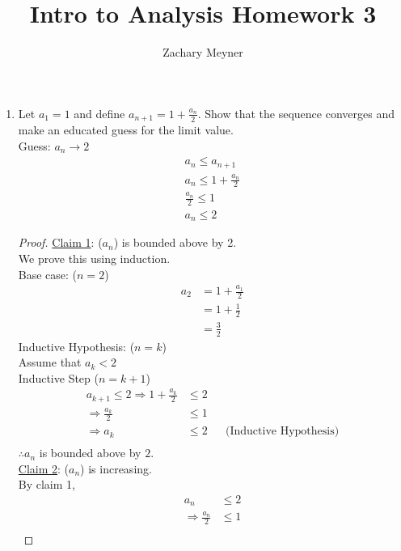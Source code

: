 \documentclass[12pt]{article}
\title{\large Intro to Analysis Homework 3}
\author{\large Zachary Meyner}
\date{}
\begin{document}
\maketitle
\begin{enumerate}
	\item Let $a_1 = 1$ and define $a_{n+1} = 1 + \frac{a_n}{2}$. Show that the sequence converges and make an
	      educated guess for the limit value. \\
	      Guess: $a_n \rightarrow 2$
	      \begin{gather*}
		      a_n \leq a_{n+1} \\
		      a_n \leq 1 + \frac{a_n}{2} \\
		      \frac{a_n}{2} \leq 1 \\
		      a_n \leq 2
	      \end{gather*}
	      \begin{proof}
		      \underline{Claim 1}: ($a_n$) is bounded above by 2. \\
		      We prove this using induction. \\
		      Base case: ($n = 2$)
		      \begin{align*}
			      a_2 & = 1+\frac{a_1}{2} \\
			          & = 1+\frac{1}{2}   \\
			          & = \frac{3}{2}
		      \end{align*}
		      Inductive Hypothesis: ($n = k$) \\
		      Assume that $a_k < 2$ \\
		      Inductive Step ($n = k+1$)
		      \begin{align*}
			      a_{k+1} \leq 2  \Rightarrow 1+\frac{a_k}{2} & \leq 2                                    \\
			      \Rightarrow \frac{a_k}{2}                   & \leq 1                                    \\
			      \Rightarrow a_k                             & \leq 2 &  & \text{(Inductive Hypothesis)} \\
		      \end{align*}
		      $\therefore a_n$ is bounded above by $2$. \\
		      \underline{Claim 2}: ($a_n$) is increasing. \\
		      By claim 1,
		      \begin{align*}
			      a_n                       & \leq 2               \\
			      \Rightarrow \frac{a_n}{2} & \leq 1               \\

\end{align*}
\end{proof}
\end{enumerate}
\end{document}

